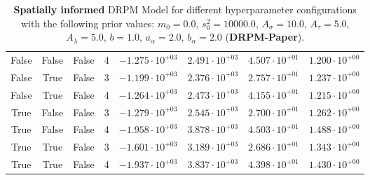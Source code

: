 \documentclass[12pt,a4paper]{article}
\begin{document}
\begin{table}
\begin{tabular}{cccccccc}
False & False & False & 4 & $-1.275 \cdot 10^{+03}$ & $2.491 \cdot 10^{+03}$ & $4.507 \cdot 10^{+01}$ & $1.200 \cdot 10^{+00}$  \\
False & True & False & 3 & $-1.199 \cdot 10^{+03}$ & $2.376 \cdot 10^{+03}$ & $2.757 \cdot 10^{+01}$ & $1.237 \cdot 10^{+00}$ \\
False & True & False & 4 & $-1.264 \cdot 10^{+03}$ & $2.473 \cdot 10^{+03}$ & $4.155 \cdot 10^{+01}$ & $1.215 \cdot 10^{+00}$ \\
True & False & False & 3 & $-1.279 \cdot 10^{+03}$ & $2.545 \cdot 10^{+03}$ & $2.700 \cdot 10^{+01}$ & $1.262 \cdot 10^{+00}$ \\
True & False & False & 4 & $-1.958 \cdot 10^{+03}$ & $3.878 \cdot 10^{+03}$ & $4.503 \cdot 10^{+01}$ & $1.488 \cdot 10^{+00}$ \\
True & True & False & 3 & $-1.601 \cdot 10^{+03}$ & $3.189 \cdot 10^{+03}$ & $2.686 \cdot 10^{+01}$ & $1.343 \cdot 10^{+00}$ \\
True & True & False & 4 & $-1.937 \cdot 10^{+03}$ & $3.837 \cdot 10^{+03}$ & $4.398 \cdot 10^{+01}$ & $1.430 \cdot 10^{+00}$ \\
\bottomrule
\end{tabular}
\caption{\textbf{Spatially informed} DRPM Model for different hyperparameter configurations with the following prior values: $m_0 = 0.0$, $s_0^2 = 10000.0$, $A_\sigma = 10.0$, $A_\tau = 5.0$, $A_\lambda = 5.0$, $b = 1.0$, $a_\alpha = 2.0$, $b_\alpha = 2.0$ (\textbf{DRPM-Paper}).}
\label{tab:DRPMExtensionDRPMPaper}
\end{table}
\end{document}
